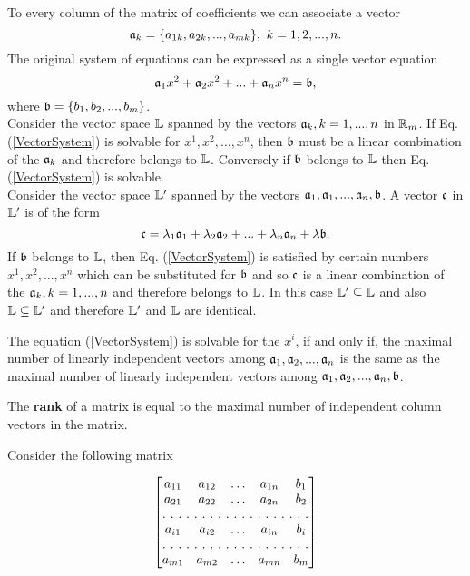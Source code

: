 To every column of the matrix of coefficients we can associate a vector
$$\mathfrak{a}_k = \{a_{1k}, a_{2k},...,a_{mk}\}, ~k = 1,2,...,n.$$
The original system of equations can be expressed as a single vector equation
\begin{equation}\mathfrak{a}_1 x^2 + \mathfrak{a}_2 x^2 + ... + \mathfrak{a}_n x^n = \mathfrak{b},\label{VectorSystem}\end{equation} where $\mathfrak{b} = \{b_1, b_2, ..., b_m\}$. \\

Consider the vector space $\mathbb{L}$ spanned by the vectors $\mathfrak{a}_k, k = 1,...,n$ in $\mathbb{R}_m$. If Eq.(\ref{VectorSystem}) is solvable for $x^1, x^2, ..., x^n$, then $\mathfrak{b}$ must be a linear combination of the $\mathfrak{a}_k$ and therefore belongs to $\mathbb{L}$. Conversely if $\mathfrak{b}$ belongs to $\mathbb{L}$ then Eq.(\ref{VectorSystem}) is solvable. \\

Consider the vector space $\mathbb{L}'$ spanned by the vectors $\mathfrak{a}_1, \mathfrak{a}_1, ..., \mathfrak{a}_n, \mathfrak{b}$. A vector $\mathfrak{c}$ in $\mathbb{L}'$ is of the form 
$$\mathfrak{c} = \lambda_1 \mathfrak{a}_1 + \lambda_2 \mathfrak{a}_2 + ... + \lambda_n \mathfrak{a}_n + \lambda \mathfrak{b}.$$ If $\mathfrak{b}$ belongs to $\mathbb{L}$, then Eq. (\ref{VectorSystem}) is satisfied by certain numbers $x^1, x^2, ..., x^n$ which can be substituted for 
$\mathfrak{b}$ and so $\mathfrak{c}$ is a linear combination of the $\mathfrak{a}_k, k = 1,..., n$ and therefore belongs to $\mathbb{L}$. In this case $\mathbb{L}' \subseteq \mathbb{L}$ and also $\mathbb{L} \subseteq \mathbb{L}'$ and therefore $\mathbb{L}'$ and $\mathbb{L}$ are identical. 

\begin{theorem}
The equation (\ref{VectorSystem}) is solvable for the $x^i$, if and only if, the maximal number of linearly independent vectors among $\mathfrak{a}_1, \mathfrak{a}_2, ..., \mathfrak{a}_n$ is the same as the maximal number of linearly independent 
vectors among $\mathfrak{a}_1, \mathfrak{a}_2, ..., \mathfrak{a}_n, \mathfrak{b}$.
\end{theorem}

\begin{definition}
The {\bf rank} of a matrix is equal to the maximal number of independent column vectors in the matrix. \\ 
\end{definition}

Consider the following matrix

\[
\begin{bmatrix}
a_{11} & a_{12}  & \hdots & a_{1n}  & b_1\\
a_{21} & a_{22}  & \hdots & a_{2n}  & b_2\\
\hdotsfor[2]{5}\\
a_{i1} & a_{i2}  & \hdots & a_{in}  & b_i \\
\hdotsfor[2]{5}\\
a_{m1} & a_{m2}  & \hdots & a_{mn}  & b_m\\
\end{bmatrix}
\]

